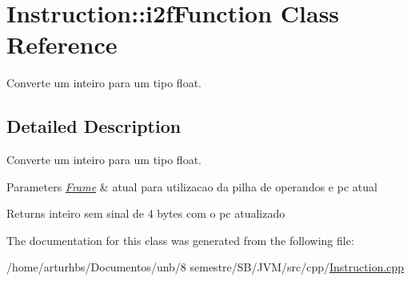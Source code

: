 \hypertarget{classInstruction_1_1i2fFunction}{}\section{Instruction\+:\+:i2f\+Function Class Reference}
\label{classInstruction_1_1i2fFunction}


Converte um inteiro para um tipo float.  




\subsection{Detailed Description}
Converte um inteiro para um tipo float. 


\begin{DoxyParams}{Parameters}
{\em \hyperlink{classFrame}{Frame}} & atual para utilizacao da pilha de operandos e pc atual \\
\hline
\end{DoxyParams}
\begin{DoxyReturn}{Returns}
inteiro sem sinal de 4 bytes com o pc atualizado 
\end{DoxyReturn}


The documentation for this class was generated from the following file\+:\begin{DoxyCompactItemize}
\item 
/home/arturhbs/\+Documentos/unb/8 semestre/\+S\+B/\+J\+V\+M/src/cpp/\hyperlink{Instruction_8cpp}{Instruction.\+cpp}\end{DoxyCompactItemize}

